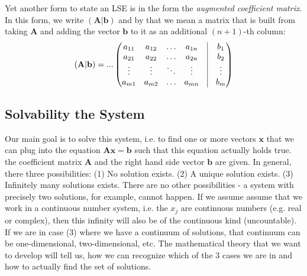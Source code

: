 
Yet another form to state an LSE is in the form the \emph{augmented coefficient matrix}. In this form, we write $(\mathbf{A|b})$ and by that we mean a matrix that is built from taking $\mathbf{A}$ and adding the vector $\mathbf{b}$ to it as an additional $(n+1)$-th column:
\begin{equation}
(\mathbf{A|b}) = ...
\begin{pmatrix}
a_{11} & a_{12} & \ldots & a_{1n} & \vline & b_1    \\
a_{21} & a_{22} & \ldots & a_{2n} & \vline & b_2    \\ 
\vdots & \vdots & \ddots & \vdots & \vline & \vdots \\
a_{m1} & a_{m2} & \ldots & a_{mn} & \vline & b_m  
\end{pmatrix}
\end{equation}





\subsection{Solvability the System}
Our main goal is to solve this system, i.e. to find one or more vectors $\mathbf{x}$ that we can plug into the equation $\mathbf{A x} = \mathbf{b}$ such that this equation actually holds true. the coefficient matrix $\mathbf{A}$ and the right hand side vector $\mathbf{b}$ are given. In general, there three possibilities: (1) No solution exists. (2) A unique solution exists. (3) Infinitely many solutions exists. There are no other possibilities - a system with precisely two solutions, for example, cannot happen. If we assume assume that we work in a continuous number system, i.e. the $x_j$ are continuous numbers (e.g. real or complex), then this infinity will also be of the continuous kind (uncountable). If we are in case (3) where we have a continuum of solutions, that continuum can be one-dimensional, two-dimensional, etc. The mathematical theory that we want to develop will tell us, how we can recognize which of the 3 cases we are in and how to actually find the set of solutions.

